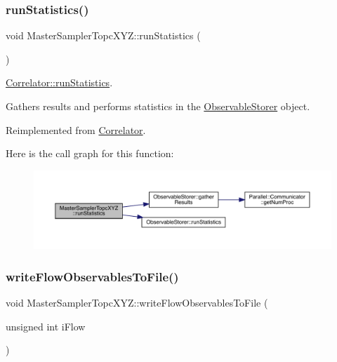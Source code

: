\subsubsection{\texorpdfstring{runStatistics()}{runStatistics()}}
{\footnotesize\ttfamily void Master\+Sampler\+Topc\+X\+Y\+Z\+::run\+Statistics (\begin{DoxyParamCaption}{ }\end{DoxyParamCaption})\hspace{0.3cm}{\ttfamily [virtual]}}



\mbox{\hyperlink{class_correlator_a35197b1d12b62ef30b79c0138a26456e}{Correlator\+::run\+Statistics}}. 

Gathers results and performs statistics in the \mbox{\hyperlink{class_observable_storer}{Observable\+Storer}} object. 

Reimplemented from \mbox{\hyperlink{class_correlator_a35197b1d12b62ef30b79c0138a26456e}{Correlator}}.

Here is the call graph for this function\+:
\nopagebreak
\begin{figure}[H]
\begin{center}
\leavevmode
\includegraphics[width=350pt]{class_master_sampler_topc_x_y_z_af748653ded9908f78383185475b9ddeb_cgraph}
\end{center}
\end{figure}
\mbox{\label{class_master_sampler_topc_x_y_z_a4fba4290e4406e18ef3f2904c6ae364f}} 
\subsubsection{\texorpdfstring{writeFlowObservablesToFile()}{writeFlowObservablesToFile()}}
{\footnotesize\ttfamily void Master\+Sampler\+Topc\+X\+Y\+Z\+::write\+Flow\+Observables\+To\+File (\begin{DoxyParamCaption}\item[{unsigned int}]{i\+Flow }\end{DoxyParamCaption})\hspace{0.3cm}{\ttfamily [virtual]}}



